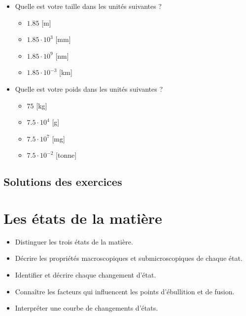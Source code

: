 \documentclass[
  11pt,
  a4paper,
  openany]{book}
\providecommand{\tightlist}{%
  \setlength{\itemsep}{0pt}\setlength{\parskip}{0pt}}
\begin{document}
\begin{Answer}

\begin{itemize}
\tightlist
\item
  Quelle est votre taille dans les unités suivantes ?

  \begin{itemize}
  \tightlist
  \item
    \(1.85\) {[}m{]}
  \item
    \(1.85 \cdot 10^3\) {[}mm{]}
  \item
    \(1.85 \cdot 10^9\) {[}nm{]}
  \item
    \(1.85 \cdot 10^{-3}\) {[}km{]}
  \end{itemize}
\item
  Quelle est votre poids dans les unités suivantes ?

  \begin{itemize}
  \tightlist
  \item
    \(75\) {[}kg{]}
  \item
    \(7.5 \cdot 10^4\) {[}g{]}
  \item
    \(7.5 \cdot 10^7\) {[}mg{]}
  \item
    \(7.5 \cdot 10^{-2}\) {[}tonne{]}
  \end{itemize}
\end{itemize}

\end{Answer}

\newpage

\section{Solutions des exercices} \shipoutAnswer

\hypertarget{les-uxe9tats-de-la-matiuxe8re}{%
\chapter{Les états de la matière}\label{les-uxe9tats-de-la-matiuxe8re}}

\begin{objectives}

\begin{itemize}
\tightlist
\item
  Distinguer les trois états de la matière.
\item
  Décrire les propriétés macroscopiques et submicroscopiques de chaque état.
\item
  Identifier et décrire chaque changement d'état.
\item
  Connaître les facteurs qui influencent les points d'ébullition et de fusion.
\item
  Interpréter une courbe de changements d'états.
\end{itemize}

\end{objectives}
\end{document}
